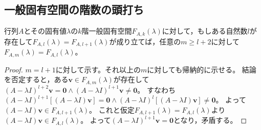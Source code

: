         \subsection{一般固有空間の階数の頭打ち}
            \begin{shadebox}
                行列$A$とその固有値$\lambda$の$k$階一般固有空間$F_{A,k}(\lambda)$に対して，もしある自然数$l$が存在して$F_{A,l}(\lambda)=F_{A,l+1}(\lambda)$が成り立てば，任意の$m\geq l+2$に対して$F_{A,m}(\lambda)=F_{A,l}(\lambda)$。
            \end{shadebox}
            \begin{proof}
                \quad\par
                $m=l+1$に対して示す。それ以上の$m$に対しても帰納的に示せる。
                結論を否定すると，ある$\bm{v}\in F_{A,m}(\lambda)$が存在して$(A-\lambda I)^{l+2}\bm{v}=\bm{0}\land(A-\lambda I)^{l+1}\bm{v}\neq\bm{0}$。
                すなわち$(A-\lambda I)^{l+1}\left[(A-\lambda I)\bm{v}\right]=\bm{0}\land(A-\lambda I)^l\left[(A-\lambda I)\bm{v}\right]\neq\bm{0}$。
                よって$(A-\lambda I)\bm{v} \in F_{A,l+1}(\lambda)$。
                これと仮定$F_{A,l+1}(\lambda) = F_{A,l}(\lambda)$より$(A-\lambda I)\bm{v} \in F_{A,l}(\lambda)$。
                よって$(A-\lambda I)^{l+1}\bm{v}=\bm{0}$となり，矛盾する。
            \end{proof}
